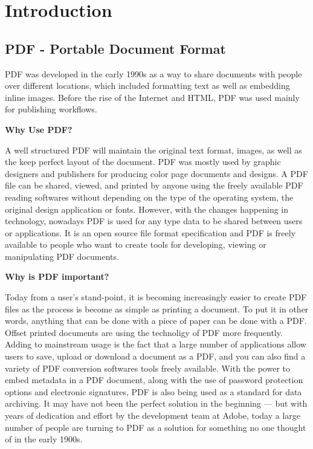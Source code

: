 \documentclass[paper.tex]{subfiles}
\begin{document}
\chapter{Introduction}

\section{PDF - Portable Document Format}
\par
PDF was developed in the early 1990s as a way to share documents with people over different locations, which included formatting text as well as embedding inline images.
Before the rise of the Internet and HTML, PDF was used mainly for publishing workflows.

\bigbreak
\textbf{Why Use PDF?}
\par
A well structured PDF will maintain the original text format, images, as well as the keep perfect layout of the document. PDF was mostly used by graphic designers and publishers for producing color page documents and designs. A PDF file can be shared, viewed, and printed by anyone using the freely available PDF reading softwares without depending on the type of the operating system, the original design application or fonts. However, with the changes happening in technology, nowadays PDF is used for any type data to be shared between users or applications. It is an open source file format specification and PDF is freely available to people who want to create tools for developing, viewing or manipulating PDF documents.

\bigbreak
\textbf{Why is PDF important?}
\par
Today from a user's stand-point, it is becoming increasingly easier to create PDF files as the process is become as simple as printing a document. To put it in other words, anything that can be done with a piece of paper can be done with a PDF. Offset printed documents are using the technoligy of PDF more frequently.
Adding to mainstream usage is the fact that a large number of applications allow users to save, upload or download a document as a PDF, and you can also find a variety of PDF conversion softwares tools freely available. With the power to embed metadata in a PDF document, along with the use of password protection options and electronic signatures, PDF is also being used as a standard for data archiving. It may have not been the perfect solution in the beginning — but with years of dedication and effort by the development team at Adobe, today a large number of people are turning to PDF as a solution for something no one thought of in the early 1900s.
\end{document}
